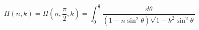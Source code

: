 \documentclass[12pt]{article}
\begin{document}
\begin{displaymath}
\Pi(n, k) = \Pi(n, \frac{\pi}{2}, k)
          = \int_0^\frac{\pi}{2} \frac{d\theta}{(1-n\sin^2\theta)\sqrt{1-k^2\sin^2\theta}}
\end{displaymath}
\end{document}
